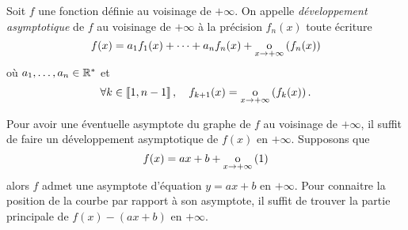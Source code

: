 \documentclass{magnolia}
\begin{document}
\begin{definition}[utile=-3]
Soit $f$ une fonction définie au voisinage de $+\infty$. On appelle \emph{développement
asymptotique} de $f$ au voisinage de $+\infty$ à la précision $f_n(x)$ toute
écriture
\[f(x)=a_1 f_1(x)+\cdots+a_n f_n(x)+\underset{x \rightarrow +\infty}{\text{o}}\left(f_n(x)\right)\]
où $a_1,\ldots,a_n\in{\mathbb{R}^*}$ et
\[\forall k\in\left\llbracket 1,n-1\right\rrbracket ,\quad f_{k+1}(x)=\underset{x \rightarrow +\infty}{\text{o}}\left(f_k(x)\right).\]
\end{definition}

\begin{remarqueUnique}
\remarque Pour avoir une éventuelle asymptote du graphe de $f$ au voisinage de $+\infty$, il suffit de faire un développement asymptotique de $f(x)$ en $+\infty$. Supposons que
\[f(x)=ax+b+\underset{x \rightarrow +\infty}{\text{o}}\left(1\right)\]
alors $f$ admet une asymptote d'équation $y=ax+b$ en $+\infty$. Pour connaitre la position de la courbe par rapport à son asymptote, il suffit de trouver la partie principale de $f(x)-(ax+b)$ en $+\infty$.


\end{remarqueUnique}
\end{document}
